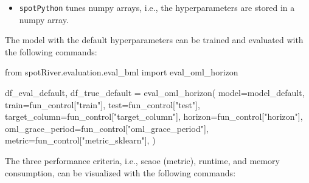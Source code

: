 \documentclass[
  letterpaper,
  DIV=11,
  numbers=noendperiod]{scrreprt}
\newenvironment{Shaded}{\begin{snugshade}}{\end{snugshade}}
\newcommand{\ImportTok}[1]{\textcolor[rgb]{0.00,0.46,0.62}{#1}}
\newcommand{\NormalTok}[1]{\textcolor[rgb]{0.00,0.23,0.31}{#1}}
\newcommand{\OperatorTok}[1]{\textcolor[rgb]{0.37,0.37,0.37}{#1}}
\newcommand{\StringTok}[1]{\textcolor[rgb]{0.13,0.47,0.30}{#1}}
\providecommand{\tightlist}{%
  \setlength{\itemsep}{0pt}\setlength{\parskip}{0pt}}\usepackage{longtable,booktabs,array}
\begin{document}
\begin{tcolorbox}[enhanced jigsaw, titlerule=0mm, colbacktitle=quarto-callout-note-color!10!white, coltitle=black, arc=.35mm, toptitle=1mm, colback=white, left=2mm, opacityback=0, bottomtitle=1mm, bottomrule=.15mm, breakable, opacitybacktitle=0.6, colframe=quarto-callout-note-color-frame, rightrule=.15mm, toprule=.15mm, leftrule=.75mm, title=\textcolor{quarto-callout-note-color}{\faInfo}\hspace{0.5em}{Note: \texttt{spotPython} tunes numpy arrays}]

\begin{itemize}
\tightlist
\item
  \texttt{spotPython} tunes numpy arrays, i.e., the hyperparameters are
  stored in a numpy array.
\end{itemize}

\end{tcolorbox}

The model with the default hyperparameters can be trained and evaluated
with the following commands:

\begin{Shaded}
\begin{Highlighting}[]
\ImportTok{from}\NormalTok{ spotRiver.evaluation.eval\_bml }\ImportTok{import}\NormalTok{ eval\_oml\_horizon}

\NormalTok{df\_eval\_default, df\_true\_default }\OperatorTok{=}\NormalTok{ eval\_oml\_horizon(}
\NormalTok{                    model}\OperatorTok{=}\NormalTok{model\_default,}
\NormalTok{                    train}\OperatorTok{=}\NormalTok{fun\_control[}\StringTok{"train"}\NormalTok{],}
\NormalTok{                    test}\OperatorTok{=}\NormalTok{fun\_control[}\StringTok{"test"}\NormalTok{],}
\NormalTok{                    target\_column}\OperatorTok{=}\NormalTok{fun\_control[}\StringTok{"target\_column"}\NormalTok{],}
\NormalTok{                    horizon}\OperatorTok{=}\NormalTok{fun\_control[}\StringTok{"horizon"}\NormalTok{],}
\NormalTok{                    oml\_grace\_period}\OperatorTok{=}\NormalTok{fun\_control[}\StringTok{"oml\_grace\_period"}\NormalTok{],}
\NormalTok{                    metric}\OperatorTok{=}\NormalTok{fun\_control[}\StringTok{"metric\_sklearn"}\NormalTok{],}
\NormalTok{                )}
\end{Highlighting}
\end{Shaded}

The three performance criteria, i.e., scaoe (metric), runtime, and
memory consumption, can be visualized with the following commands:
\end{document}
